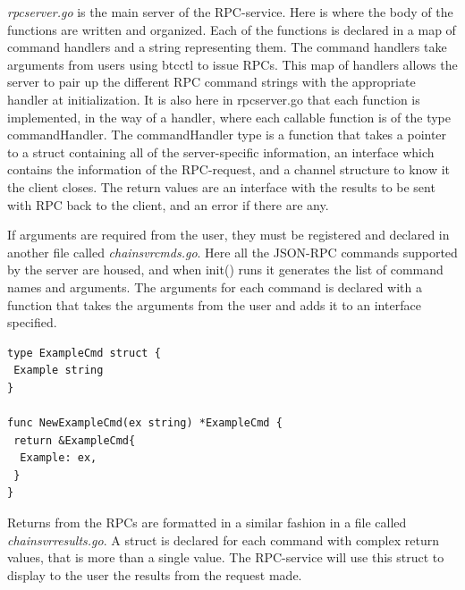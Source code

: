 \documentclass[11pt]{article}
\begin{document}
{\it{rpcserver.go}} is the main server of the RPC-service. Here is where the body of the functions are written and organized. Each of the functions is declared in a map of command handlers and a string representing them. The command handlers take arguments from users using btcctl to issue RPCs. This map of handlers allows the server to pair up the different RPC command strings with the appropriate handler at initialization. It is also here in rpcserver.go that each function is implemented, in the way of a handler, where each callable function is of the type commandHandler. The commandHandler type is a function that takes a pointer to a struct containing all of the server-specific information, an interface which contains the information of the RPC-request, and a channel structure to know it the client closes. The return values are an interface with the results to be sent with RPC back to the client, and an error if there are any.

If arguments are required from the user, they must be registered and declared in another file called {\it{chainsvrcmds.go}}. Here all the JSON-RPC commands supported by the server are housed, and when init() runs it generates the list of command names and arguments. The arguments for each command is declared with a function that takes the arguments from the user and adds it to an interface specified. 


\begin{lstlisting}[float=h!,caption={Command argument formatting},label=lst:cmdArg]
type ExampleCmd struct {
 Example string
}

func NewExampleCmd(ex string) *ExampleCmd {
 return &ExampleCmd{
  Example: ex,
 }
}
\end{lstlisting}

Returns from the RPCs are formatted in a similar fashion in a file called \textit{chainsvrresults.go}. A struct is declared for each command with complex return values, that is more than a single value. The RPC-service will use this struct to display to the user the results from the request made. 
\end{document}
